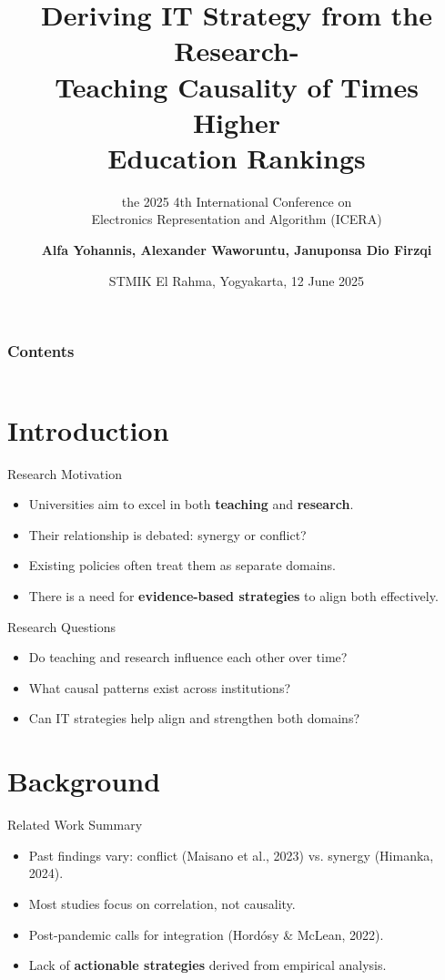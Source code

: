 \documentclass[aspectratio=169, table]{beamer}
\subtitle{the 2025 4th International Conference on\\Electronics Representation and Algorithm (ICERA)}
\title{Deriving IT Strategy from the Research-\\Teaching Causality of Times Higher\\Education Rankings}
\date[Serial]{\scriptsize {STMIK El Rahma, Yogyakarta, 12 June 2025}}
\author[Pradita]{\footnotesize{\textbf{Alfa Yohannis, Alexander Waworuntu, Januponsa Dio Firzqi}}}
\begin{document}
\frame{\titlepage}

\begin{frame}[fragile]
\frametitle{Contents}
\vspace{20pt}
\begin{columns}[t]
\tableofcontents[sections={1-4}]

\tableofcontents[sections={5-10}]
\end{columns}
\end{frame}

\section{Introduction}

\begin{frame}[fragile]{Research Motivation}
	\vspace{20pt}
	
	\begin{itemize}
		\item Universities aim to excel in both \textbf{teaching} and \textbf{research}.
		\item Their relationship is debated: synergy or conflict?
		\item Existing policies often treat them as separate domains.
		\item There is a need for \textbf{evidence-based strategies} to align both effectively.
	\end{itemize}
\end{frame}

\begin{frame}[fragile]{Research Questions}
	\vspace{20pt}
	\begin{itemize}
		\item Do teaching and research influence each other over time?
		\item What causal patterns exist across institutions?
		\item Can IT strategies help align and strengthen both domains?
	\end{itemize}
\end{frame}

\section{Background}

\begin{frame}[fragile]{Related Work Summary}
	\vspace{20pt}
	\begin{itemize}
		\item Past findings vary: conflict (Maisano et al., 2023) vs. synergy (Himanka, 2024).
		\item Most studies focus on correlation, not causality.
		\item Post-pandemic calls for integration (Hordósy \& McLean, 2022).
		\item Lack of \textbf{actionable strategies} derived from empirical analysis.
	\end{itemize}
\end{frame}
\end{document}
